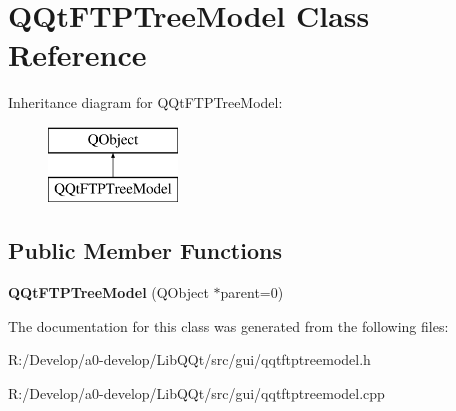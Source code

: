 \hypertarget{class_q_qt_f_t_p_tree_model}{}\section{Q\+Qt\+F\+T\+P\+Tree\+Model Class Reference}
\label{class_q_qt_f_t_p_tree_model}
Inheritance diagram for Q\+Qt\+F\+T\+P\+Tree\+Model\+:\begin{figure}[H]
\begin{center}
\leavevmode
\includegraphics[height=2.000000cm]{class_q_qt_f_t_p_tree_model}
\end{center}
\end{figure}
\subsection*{Public Member Functions}
\begin{DoxyCompactItemize}
\item 
\mbox{\label{class_q_qt_f_t_p_tree_model_a9624d1b791b2ec046e42d96e2850d33d}} 
{\bfseries Q\+Qt\+F\+T\+P\+Tree\+Model} (Q\+Object $\ast$parent=0)
\end{DoxyCompactItemize}


The documentation for this class was generated from the following files\+:\begin{DoxyCompactItemize}
\item 
R\+:/\+Develop/a0-\/develop/\+Lib\+Q\+Qt/src/gui/qqtftptreemodel.\+h\item 
R\+:/\+Develop/a0-\/develop/\+Lib\+Q\+Qt/src/gui/qqtftptreemodel.\+cpp\end{DoxyCompactItemize}
